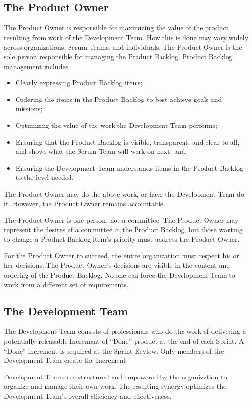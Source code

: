 \subsection{The Product Owner}
The Product Owner is responsible for maximizing the value of the product resulting from work
of the Development Team. How this is done may vary widely across organizations, Scrum Teams,
and individuals.
The Product Owner is the sole person responsible for managing the Product Backlog. Product
Backlog management includes:
\begin{itemize}
\item Clearly expressing Product Backlog items;
\item Ordering the items in the Product Backlog to best achieve goals and missions;
\item Optimizing the value of the work the Development Team performs;
\item Ensuring that the Product Backlog is visible, transparent, and clear to all, and shows what
      the Scrum Team will work on next; and,
\item Ensuring the Development Team understands items in the Product Backlog to the level needed.
\end{itemize}
The Product Owner may do the above work, or have the Development Team do it. However, the
Product Owner remains accountable.

The Product Owner is one person, not a committee. The Product Owner may represent the
desires of a committee in the Product Backlog, but those wanting to change a Product Backlog
item's priority must address the Product Owner.

For the Product Owner to succeed, the entire organization must respect his or her decisions. The
Product Owner's decisions are visible in the content and ordering of the Product Backlog. No
one can force the Development Team to work from a different set of requirements.

\subsection{The Development Team}
The Development Team consists of professionals who do the work of delivering a potentially
releasable Increment of ``Done'' product at the end of each Sprint. A ``Done'' increment is
required at the Sprint Review. Only members of the Development Team create the Increment.

Development Teams are structured and empowered by the organization to organize and
manage their own work. The resulting synergy optimizes the Development Team's overall
efficiency and effectiveness.

